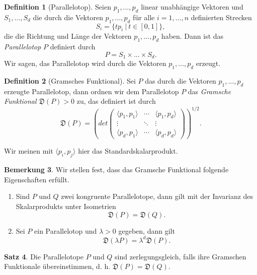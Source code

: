 \documentclass[11pt,titlepage]{article}
\theoremstyle{definition}
\newtheorem{theorem}{Satz}[section]
\newtheorem{definition}[theorem]{Definition}
\newtheorem{remark}[theorem]{Bemerkung}
\theoremstyle{remark}
\begin{document}
	
	\begin{definition}[Parallelotop]
		Seien $p_1,\ldots,p_d$ linear unabhängige Vektoren und $S_1,\ldots,S_d$ 
		die durch die Vektoren $p_1,\ldots,p_d$ für alle $i=1,\ldots,n$ 
		definierten Strecken
		\[S_i=\{tp_i\ \vert\ t\in[0,1]\},\]
		die die Richtung und Länge der Vektoren $p_1,\ldots,p_d$ 
		haben. Dann ist das \textsl{Parallelotop} $P$ definiert durch 
		\[P=S_1\times\ldots\times S_d.\]
		Wir sagen, das Parallelotop wird durch die Vektoren $p_1,\ldots,p_d$ 
		erzeugt.
	\end{definition}
	
	\begin{definition}[Gramsches Funktional]
		Sei $P$ das durch die Vektoren $p_1,\ldots,p_d$ 
		erzeugte Parallelotop, dann ordnen wir dem Parallelotop $P$ das 
		\textsl{Gramsche Funktional} $\mathfrak{D}(P)>0$ zu, das definiert ist durch
		\[\mathfrak{D}(P)=\left(det \begin{pmatrix}
		\langle p_1,p_1\rangle & \cdots &\langle p_1,p_d\rangle \\
		\vdots & \ddots & \vdots \\
		\langle p_d,p_1 \rangle & \cdots & \langle p_d,p_d \rangle
		\end{pmatrix}\right)^{1/2}.\]
	\end{definition}
	
	Wir meinen mit $\langle p_i,p_j\rangle$ hier das Standardskalarprodukt. 
	
	\begin{remark} \label{bem:gramfunk}
		Wir stellen fest, dass das Gramsche Funktional folgende Eigenschaften 
		erfüllt.
		\begin{enumerate}
			\item Sind $P$ und $Q$ zwei kongruente Parallelotope, dann gilt mit 
			der Invarianz des Skalarprodukts unter Isometrien
			\[\mathfrak{D}(P)=\mathfrak{D}(Q).\]
			\item Sei $P$ ein Parallelotop und $\lambda>0$ gegeben, dann gilt 
			\[\mathfrak{D}(\lambda P)=\lambda^d \mathfrak{D}(P).\]
		\end{enumerate}
	\end{remark}
	
	\begin{theorem} \label{thm:zerlgram}
		Die Parallelotope $P$ und $Q$ sind zerlegungsgleich, falls ihre 
		Gramschen Funktionale übereinstimmen, d. h. $\mathfrak{D}(P)=\mathfrak{D}(Q)$.
	\end{theorem}
	
\end{document}
